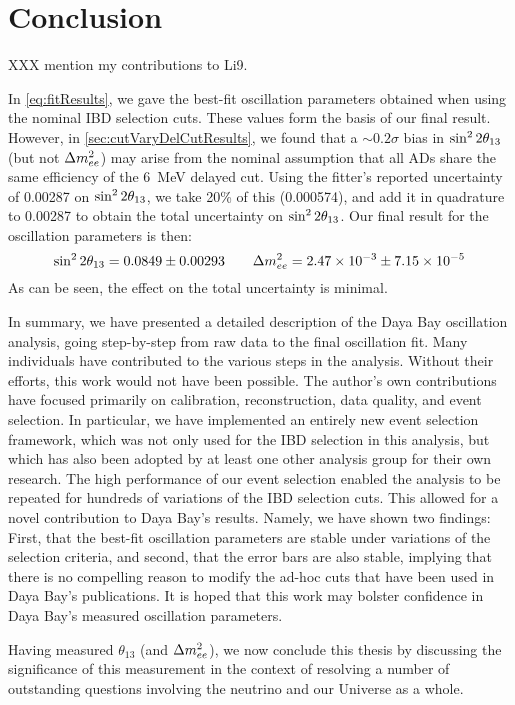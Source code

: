 \documentclass[../thesis.tex]{subfiles}
\begin{document}
\chapter{Conclusion}
\label{chap:conclusion}

XXX mention my contributions to Li9.

In \autoref{eq:fitResults}, we gave the best-fit oscillation parameters obtained when using the nominal IBD selection cuts. These values form the basis of our final result. However, in \autoref{sec:cutVaryDelCutResults}, we found that a $\sim0.2\sigma$ bias in $\sin^2 2\theta_{13}$ (but not $\Delta m^2_{ee}$) may arise from the nominal assumption that all ADs share the same efficiency of the 6~MeV delayed cut. Using the fitter's reported uncertainty of 0.00287 on $\sin^2 2\theta_{13}$, we take 20\% of this (0.000574), and add it in quadrature to 0.00287 to obtain the total uncertainty on $\sin^2 2\theta_{13}$. Our final result for the oscillation parameters is then:
\begin{equation}
  \sin^2 2\theta_{13} = 0.0849 \pm 0.00293 \qquad \Delta m^2_{ee} = 2.47\times10^{-3} \pm 7.15\times10^{-5}
  \label{eq:fitResults}
\end{equation}
As can be seen, the effect on the total uncertainty is minimal.

In summary, we have presented a detailed description of the Daya Bay oscillation analysis, going step-by-step from raw data to the final oscillation fit. Many individuals have contributed to the various steps in the analysis. Without their efforts, this work would not have been possible. The author's own contributions have focused primarily on calibration, reconstruction, data quality, and event selection. In particular, we have implemented an entirely new event selection framework, which was not only used for the IBD selection in this analysis, but which has also been adopted by at least one other analysis group for their own research. The high performance of our event selection enabled the analysis to be repeated for hundreds of variations of the IBD selection cuts. This allowed for a novel contribution to Daya Bay's results. Namely, we have shown two findings: First, that the best-fit oscillation parameters are stable under variations of the selection criteria, and second, that the error bars are also stable, implying that there is no compelling reason to modify the ad-hoc cuts that have been used in Daya Bay's publications. It is hoped that this work may bolster confidence in Daya Bay's measured oscillation parameters.

Having measured $\theta_{13}$ (and $\Delta m^2_{ee}$), we now conclude this thesis by discussing the significance of this measurement in the context of resolving a number of outstanding questions involving the neutrino and our Universe as a whole.
\end{document}

